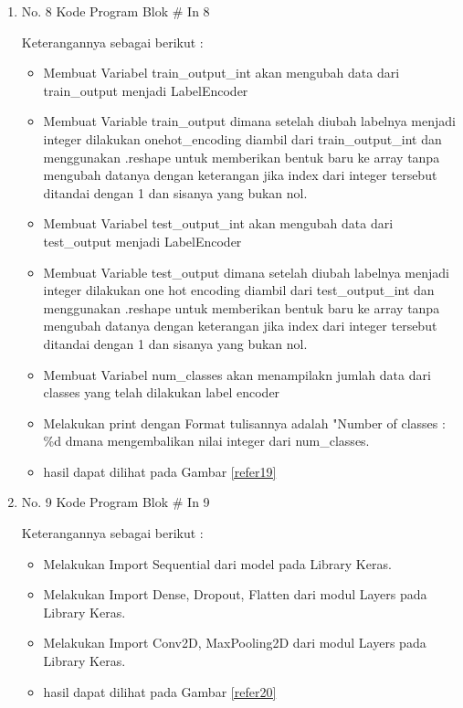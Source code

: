 \begin{enumerate}
\item No. 8 Kode Program Blok \# In 8
\par 
Keterangannya sebagai berikut :
\begin{itemize}
\item Membuat Variabel train\_output\_int  akan mengubah data dari train\_output menjadi LabelEncoder
\item Membuat Variable train\_output dimana setelah diubah labelnya menjadi integer dilakukan onehot\_encoding diambil dari train\_output\_int dan menggunakan .reshape untuk memberikan bentuk baru ke array tanpa mengubah datanya dengan keterangan jika index dari integer tersebut ditandai dengan 1 dan sisanya yang bukan nol.
\item Membuat Variabel test\_output\_int  akan mengubah data dari test\_output menjadi LabelEncoder
\item Membuat Variable test\_output dimana setelah diubah labelnya menjadi integer dilakukan one hot encoding diambil dari test\_output\_int dan menggunakan .reshape untuk memberikan bentuk baru ke array tanpa mengubah datanya dengan keterangan jika index dari integer tersebut ditandai dengan 1 dan sisanya yang bukan nol.
\item Membuat Variabel num\_classes akan menampilakn jumlah data dari classes yang telah dilakukan label encoder
\item Melakukan print dengan Format tulisannya adalah "Number of classes : \%d dmana mengembalikan nilai integer dari num\_classes.
\item hasil dapat dilihat pada Gambar \ref{refer19}
\end{itemize}



\item No. 9 Kode Program Blok \# In 9
\par 
Keterangannya sebagai berikut :
\begin{itemize}
\item Melakukan Import Sequential dari model pada Library Keras.
\item Melakukan Import Dense, Dropout, Flatten dari modul Layers pada Library Keras.
\item Melakukan Import Conv2D, MaxPooling2D dari modul Layers pada Library Keras.
\item hasil dapat dilihat pada Gambar \ref{refer20}
\end{itemize}


\end{enumerate}
